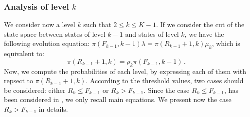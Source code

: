 \documentclass[conference]{IEEEtran}
\begin{document}


\subsubsection{Analysis of level $k$}
We consider now a level $k$ such that $2 \leq  k \leq K-1$. 
If we consider the cut of the state space between states of level $k-1$ and states of level $k$,  we have   
the following  evolution equation: $\pi(F_{k-1},k-1) \lambda=  \pi(R_{k-1}+1,k) \mu_k$, which is equivalent to:
\begin{equation}
\pi(R_{k-1}+1,k)= \rho_k \pi(F_{k-1},k-1) \, .
\label{eq14b}
\end{equation}
Now, we compute the probabilities of each level, by
expressing  each of them with repsect to $\pi(R_{k-1}+1,k)$.  
According to the threshold values,
two cases should be considered:
either $R_{k} \leq F_{k-1}$ or $R_{k} > F_{k-1}$. Since the case  $R_{k} \leq F_{k-1}$, has been considered in \cite{le2000simple}, 
we only recall main equations. 
We present now the case $R_{k} > F_{k-1}$ in details. 

\end{document}
